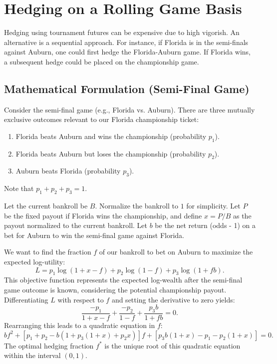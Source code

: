 \documentclass{article}
\begin{document}
\section{Hedging on a Rolling Game Basis}

Hedging using tournament futures can be expensive due to high vigorish. An alternative is a sequential approach. For instance, if Florida is in the semi-finals against Auburn, one could first hedge the Florida-Auburn game. If Florida wins, a subsequent hedge could be placed on the championship game.

\subsection{Mathematical Formulation (Semi-Final Game)}

Consider the semi-final game (e.g., Florida vs. Auburn). There are three mutually exclusive outcomes relevant to our Florida championship ticket:
\begin{enumerate}
    \item Florida beats Auburn and wins the championship (probability $p_1$).
    \item Florida beats Auburn but loses the championship (probability $p_2$).
    \item Auburn beats Florida (probability $p_3$).
\end{enumerate}
Note that $p_1 + p_2 + p_3 = 1$.

Let the current bankroll be $B$. Normalize the bankroll to $1$ for simplicity. Let $P$ be the fixed payout if Florida wins the championship, and define $x = P/B$ as the payout normalized to the current bankroll. Let $b$ be the net return (odds - 1) on a bet for Auburn to win the semi-final game against Florida.

We want to find the fraction $f$ of our bankroll to bet on Auburn to maximize the expected log-utility:
\begin{equation}
L = p_1 \log(1 + x - f) + p_2 \log(1 - f)+ p_3 \log(1 + f b).
\end{equation}
This objective function represents the expected log-wealth after the semi-final game outcome is known, considering the potential championship payout. Differentiating $L$ with respect to $f$ and setting the derivative to zero yields:
\[
\frac{-p_1}{1 + x - f} + \frac{-p_2}{1 - f} + \frac{p_3 b}{1 + fb} = 0.
\]
Rearranging this leads to a quadratic equation in $f$:
\begin{equation} \label{eq:quadratic}
b f^2 + [p_1 + p_2 - b(1 + p_3(1+x) + p_2 x)] f + [p_3 b(1+x) - p_1 - p_2(1+x)] = 0.
\end{equation}
The optimal hedging fraction $f^*$ is the unique root of this quadratic equation within the interval $(0, 1)$.
\end{document}
